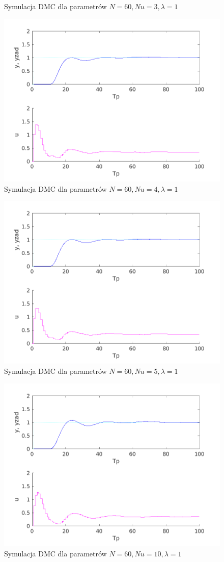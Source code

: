 \documentclass[a4paper, 10pt]{article}
\begin{document}
\begin{figure}
\caption{Symulacja DMC dla parametrów $N=60, Nu = 3, \lambda = 1$}
\label{fig:z5_60_60_3_1}
\end{figure}\begin{figure}
\centering
\includegraphics[width=0.7\linewidth]{z5_60_60_4_1.png}
\caption{Symulacja DMC dla parametrów $N=60, Nu = 4, \lambda = 1$}
\label{fig:z5_60_60_4_1}
\end{figure}\begin{figure}
\centering
\includegraphics[width=0.7\linewidth]{z5_60_60_5_1.png}
\caption{Symulacja DMC dla parametrów $N=60, Nu = 5, \lambda = 1$}
\label{fig:z5_60_60_5_1}
\end{figure}
	\begin{figure}
		\centering
		\includegraphics[width=0.7\linewidth]{z5_60_60_10_1.png}
		\caption{Symulacja DMC dla parametrów $N=60, Nu = 10, \lambda = 1$}
		\label{fig:z5_60_60_10_1}
	\end{figure}
\end{document}
